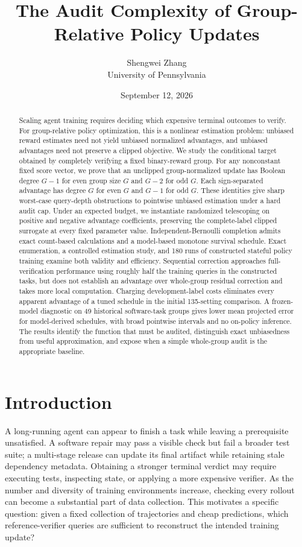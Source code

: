 \documentclass[11pt]{article}
\title{The Audit Complexity of Group-Relative Policy Updates}
\author{Shengwei Zhang\\University of Pennsylvania}
\date{September 12, 2026}
\begin{document}
\maketitle
\begin{abstract}
Scaling agent training requires deciding which expensive terminal outcomes to verify. For group-relative policy optimization, this is a nonlinear estimation problem: unbiased reward estimates need not yield unbiased normalized advantages, and unbiased advantages need not preserve a clipped objective. We study the conditional target obtained by completely verifying a fixed binary-reward group. For any nonconstant fixed score vector, we prove that an unclipped group-normalized update has Boolean degree $G-1$ for even group size $G$ and $G-2$ for odd $G$. Each sign-separated advantage has degree $G$ for even $G$ and $G-1$ for odd $G$. These identities give sharp worst-case query-depth obstructions to pointwise unbiased estimation under a hard audit cap. Under an expected budget, we instantiate randomized telescoping on positive and negative advantage coefficients, preserving the complete-label clipped surrogate at every fixed parameter value. Independent-Bernoulli completion admits exact count-based calculations and a model-based monotone survival schedule. Exact enumeration, a controlled estimation study, and 180 runs of constructed stateful policy training examine both validity and efficiency. Sequential correction approaches full-verification performance using roughly half the training queries in the constructed tasks, but does not establish an advantage over whole-group residual correction and takes more local computation. Charging development-label costs eliminates every apparent advantage of a tuned schedule in the initial 135-setting comparison. A frozen-model diagnostic on 49 historical software-task groups gives lower mean projected error for model-derived schedules, with broad pointwise intervals and no on-policy inference. The results identify the function that must be audited, distinguish exact unbiasedness from useful approximation, and expose when a simple whole-group audit is the appropriate baseline.
\end{abstract}

\section{Introduction}
A long-running agent can appear to finish a task while leaving a prerequisite unsatisfied. A software repair may pass a visible check but fail a broader test suite; a multi-stage release can update its final artifact while retaining stale dependency metadata. Obtaining a stronger terminal verdict may require executing tests, inspecting state, or applying a more expensive verifier. As the number and diversity of training environments increase, checking every rollout can become a substantial part of data collection. This motivates a specific question: given a fixed collection of trajectories and cheap predictions, which reference-verifier queries are sufficient to reconstruct the intended training update?
\end{document}
